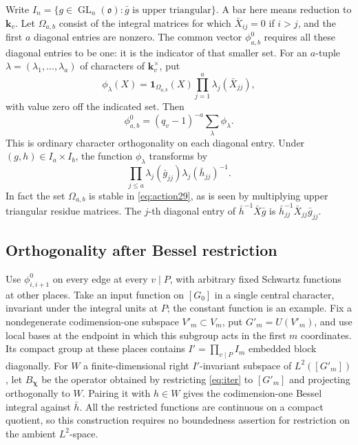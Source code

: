 \documentclass[a4paper,11pt]{article}
\theoremstyle{definition}
\theoremstyle{remark}
\numberwithin{equation}{section}
\newcommand{\GL}{\operatorname{GL}}
\begin{document}
Write \(I_n=\{g\in\GL_n(\mathfrak o):\bar g\text{ is upper triangular}\}\). A bar here means reduction to \(\mathbf k_v\). Let \(\Omega_{a,b}\) consist of the integral matrices for which \(\bar X_{ij}=0\) if \(i>j\), and the first \(a\) diagonal entries are nonzero. The common vector \(\phi^0_{a,b}\) requires all these diagonal entries to be one: it is the indicator of that smaller set. For an \(a\)-tuple \(\lambda=(\lambda_1,\ldots,\lambda_a)\) of characters of \(\mathbf k_v^\times\), put
\[
 \phi_\lambda(X)=\mathbf1_{\Omega_{a,b}}(X)
                      \prod_{j=1}^{a}\lambda_j(\bar X_{jj}),
\]
with value zero off the indicated set. Then
\begin{equation}
  \phi^0_{a,b}=(q_v-1)^{-a}\sum_\lambda \phi_\lambda.
  \label{eq:common29}
\end{equation}
This is ordinary character orthogonality on each diagonal entry. Under \((g,h)\in I_a\times I_b\), the function \(\phi_\lambda\) transforms by
\[
     \prod_{j\le a}\lambda_j(\bar g_{jj})\lambda_j(\bar h_{jj})^{-1}.
\]
In fact the set \(\Omega_{a,b}\) is stable in \eqref{eq:action29}, as is seen by multiplying upper triangular residue matrices. The \(j\)-th diagonal entry of \(\bar h^{-1}\bar X\bar g\) is \(\bar h_{jj}^{-1}\bar X_{jj}\bar g_{jj}\).

\subsection{Orthogonality after Bessel restriction}\label{nav:I-46}
\label{sec:bessel29}

Use \(\phi^0_{i,i+1}\) on every edge at every \(v\mid P\), with arbitrary fixed Schwartz functions at other places. Take an input function on \([G_0]\) in a single central character, invariant under the integral units at \(P\); the constant function is an example. Fix a nondegenerate codimension-one subspace \(V'_m\subset V_m\), put \(G'_m=U(V'_m)\), and use local bases at the endpoint in which this subgroup acts in the first \(m\) coordinates. Its compact group at these places contains \(I'=\prod_{v\mid P} I_m\) embedded block diagonally. For \(W\) a finite-dimensional right \(I'\)-invariant subspace of \(L^2([G'_m])\), let \(B_{\boldsymbol\chi}\) be the operator obtained by restricting \eqref{eq:iter} to \([G'_m]\) and projecting orthogonally to \(W\). Pairing it with \(h\in W\) gives the codimension-one Bessel integral against \(\bar h\). All the restricted functions are continuous on a compact quotient, so this construction requires no boundedness assertion for restriction on the ambient \(L^2\)-space.
\end{document}
